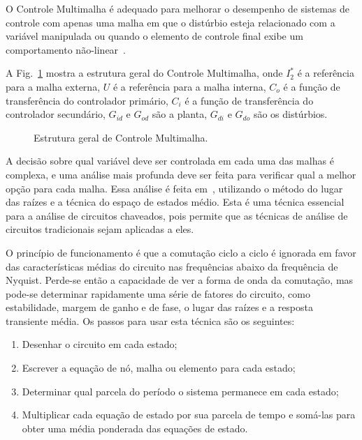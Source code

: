 
  O Controle Multimalha é adequado para melhorar o desempenho de sistemas de controle com apenas uma malha em que o distúrbio esteja relacionado com a variável manipulada ou quando o elemento de controle final exibe um comportamento não-linear~\cite{ref:LEE}.

  A Fig.~\ref{fig:multiloop} mostra a estrutura geral do Controle Multimalha, onde $I_2^*$ é a referência para a malha externa, $U$ é a referência para a malha interna, $C_o$ é a função de transferência do controlador primário, $C_i$ é a função de transferência do controlador secundário, $G_{id}$ e $G_{od}$ são a planta, $G_{di}$ e $G_{do}$ são os distúrbios.


  \begin{figure}[htb]
    \renewcommand\figurename{Fig.}
    \caption{Estrutura geral de Controle Multimalha.}
    \label{fig:multiloop}
  \end{figure}

  A decisão sobre qual variável deve ser controlada em cada uma das malhas é complexa, e uma análise mais profunda deve ser feita para verificar qual a melhor opção para cada malha. Essa análise é feita em~\cite{ref:NASER}, utilizando o método do lugar das raízes e a técnica do espaço de estados médio. Esta é uma técnica essencial para a análise de circuitos chaveados, pois permite que as técnicas de análise de circuitos tradicionais sejam aplicadas a eles.

  O princípio de funcionamento é que a comutação ciclo a ciclo é ignorada em favor das características médias do circuito nas frequências abaixo da frequência de Nyquist. Perde-se então a capacidade de ver a forma de onda da comutação, mas pode-se determinar rapidamente uma série de fatores do circuito, como estabilidade, margem de ganho e de fase, o lugar das raízes e a resposta transiente média. Os passos para usar esta técnica são
  os seguintes:

  \begin{enumerate}
    \item Desenhar o circuito em cada estado;
    \item Escrever a equação de nó, malha ou elemento para cada estado;
    \item Determinar qual parcela do período o sistema permanece em cada estado;
    \item Multiplicar cada equação de estado por sua parcela de tempo e somá-las para obter uma média ponderada das equações de estado.
  \end{enumerate}

